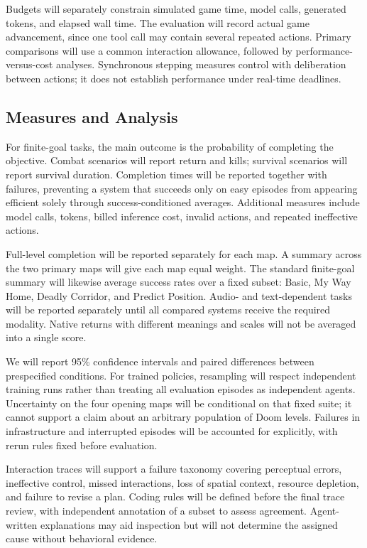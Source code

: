 Budgets will separately constrain simulated game time, model calls, generated tokens, and elapsed wall time. The evaluation will record actual game advancement, since one tool call may contain several repeated actions. Primary comparisons will use a common interaction allowance, followed by performance-versus-cost analyses. Synchronous stepping measures control with deliberation between actions; it does not establish performance under real-time deadlines.

\subsection{Measures and Analysis}
For finite-goal tasks, the main outcome is the probability of completing the objective. Combat scenarios will report return and kills; survival scenarios will report survival duration. Completion times will be reported together with failures, preventing a system that succeeds only on easy episodes from appearing efficient solely through success-conditioned averages. Additional measures include model calls, tokens, billed inference cost, invalid actions, and repeated ineffective actions.

Full-level completion will be reported separately for each map. A summary across the two primary maps will give each map equal weight. The standard finite-goal summary will likewise average success rates over a fixed subset: Basic, My Way Home, Deadly Corridor, and Predict Position. Audio- and text-dependent tasks will be reported separately until all compared systems receive the required modality. Native returns with different meanings and scales will not be averaged into a single score.

We will report 95\% confidence intervals and paired differences between prespecified conditions. For trained policies, resampling will respect independent training runs rather than treating all evaluation episodes as independent agents. Uncertainty on the four opening maps will be conditional on that fixed suite; it cannot support a claim about an arbitrary population of Doom levels. Failures in infrastructure and interrupted episodes will be accounted for explicitly, with rerun rules fixed before evaluation.

Interaction traces will support a failure taxonomy covering perceptual errors, ineffective control, missed interactions, loss of spatial context, resource depletion, and failure to revise a plan. Coding rules will be defined before the final trace review, with independent annotation of a subset to assess agreement. Agent-written explanations may aid inspection but will not determine the assigned cause without behavioral evidence.

